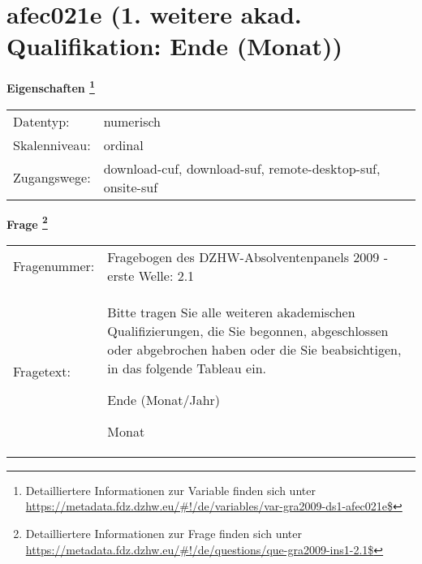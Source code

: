 
    \setcounter{footnote}{0}

    \vspace*{-1.8cm}
	\section{afec021e (1. weitere akad. Qualifikation: Ende (Monat))}
	\label{section:afec021e}



    \vspace*{0.5cm}
    \noindent\textbf{Eigenschaften
	\footnote{Detailliertere Informationen zur Variable finden sich unter
		\url{https://metadata.fdz.dzhw.eu/\#!/de/variables/var-gra2009-ds1-afec021e$}}}\\
	\begin{tabularx}{\hsize}{@{}lX}
	Datentyp: & numerisch \\
	Skalenniveau: & ordinal \\
	Zugangswege: &
	  download-cuf, 
	  download-suf, 
	  remote-desktop-suf, 
	  onsite-suf
 \\
    \end{tabularx}



				\vspace*{0.5cm}
                \noindent\textbf{Frage
	                \footnote{Detailliertere Informationen zur Frage finden sich unter
		              \url{https://metadata.fdz.dzhw.eu/\#!/de/questions/que-gra2009-ins1-2.1$}}}\\
				\begin{tabularx}{\hsize}{@{}lX}
					Fragenummer: &
					  Fragebogen des DZHW-Absolventenpanels 2009 - erste Welle:
					  2.1
 \\
					Fragetext: & Bitte tragen Sie alle weiteren akademischen Qualifizierungen, die Sie begonnen, abgeschlossen oder abgebrochen haben oder die Sie beabsichtigen, in das folgende Tableau ein.\par  Ende (Monat/Jahr)\par  Monat \\
				\end{tabularx}





